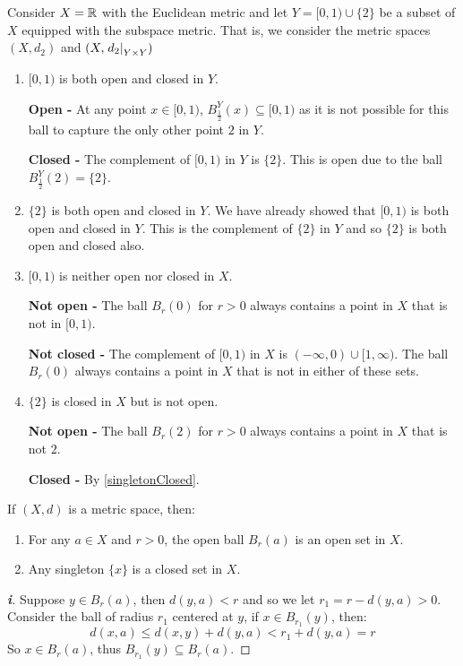 \documentclass[../main.tex]{subfiles}
\begin{document}
\begin{example} \label{subspaceMetric}
  Consider $X = \mathbb{R}$ with the Euclidean metric and let $Y = [0, 1) \cup \{2\}$ be a subset of $X$ equipped with the subspace metric.
  That is, we consider the metric spaces $(X, d_2)$ and $(X, \left. d_2 \right|_{Y \times Y})$
  \begin{enumerate}
    \item $[0, 1)$ is both open and closed in $Y$.\par
      \textbf{Open - } At any point $x \in [0, 1)$, $B^{Y}_{\frac{1}{2}}(x) \subseteq [0, 1)$ as it is not possible for this ball to capture the only other point $2$ in $Y$.

      \textbf{Closed - } The complement of $[0, 1)$ in $Y$ is $\{2\}$.
        This is open due to the ball $B^{Y}_{\frac{1}{2}}(2) = \{2\}$.
    \item $\{2\}$ is both open and closed in $Y$.
      We have already showed that $[0, 1)$ is both open and closed in $Y$.
      This is the complement of $\{2\}$ in $Y$ and so $\{2\}$ is both open and closed also.
    \item $[0, 1)$ is neither open nor closed in $X$.\par
      \textbf{Not open -} The ball $B_r(0)$ for $r > 0$ always contains a point in $X$ that is not in $[0, 1)$.

      \textbf{Not closed -} The complement of $[0, 1)$ in $X$ is $(-\infty, 0) \cup [1, \infty)$.
        The ball $B_r(0)$ always contains a point in $X$ that is not in either of these sets.
    \item $\{2\}$ is closed in $X$ but is not open.\par
      \textbf{Not open - } The ball $B_r(2)$ for $r > 0$ always contains a point in $X$ that is not $2$.

      \textbf{Closed - } By \cref{singletonClosed}.
  \end{enumerate}
\end{example}
\begin{proposition}
  If $(X, d)$ is a metric space, then: \label{singletonClosed}
  \begin{enumerate}
    \item For any $a \in X$ and $r > 0$, the open ball $B_r(a)$ is an open set in $X$.
    \item Any singleton $\{x\}$ is a closed set in $X$.
  \end{enumerate}
\end{proposition}
\begin{proof}[\textbf{i}]
  Suppose $y \in B_r(a)$, then $d(y, a) < r$ and so we let $r_1 = r - d(y, a) > 0$.
  Consider the ball of radius $r_1$ centered at $y$, if $x \in B_{r_1}(y)$, then:
  \[
    d(x, a) \leq d(x, y) + d(y, a) < r_1 + d(y, a) = r
  \]
  So $x \in B_r(a)$, thus $B_{r_1}(y) \subseteq B_r(a)$.
\end{proof}
\end{document}

